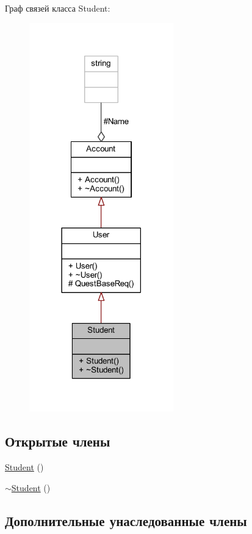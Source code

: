 Граф связей класса Student\+:\nopagebreak
\begin{figure}[H]
\begin{center}
\leavevmode
\includegraphics[width=177pt]{dd/db9/class_student__coll__graph}
\end{center}
\end{figure}
\subsection*{Открытые члены}
\begin{DoxyCompactItemize}
\item 
\hyperlink{class_student_af9168cedbfa5565cf0b20c1a9d3f5c9d}{Student} ()
\item 
\hyperlink{class_student_a54a8ea060d6cd04222c3a2f89829f105}{$\sim$\+Student} ()
\end{DoxyCompactItemize}
\subsection*{Дополнительные унаследованные члены}



